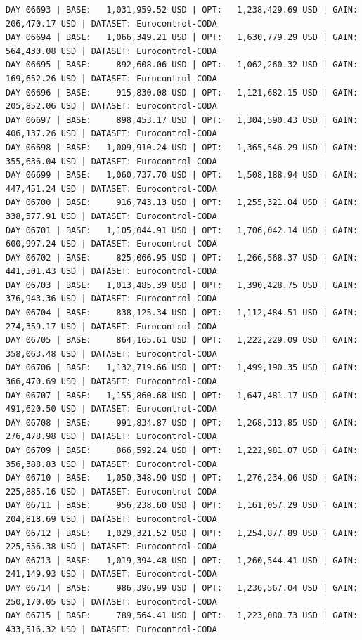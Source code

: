 \documentclass[11pt,a4paper]{article}
\begin{document}
\begin{verbatim}
DAY 06693 | BASE:   1,031,959.52 USD | OPT:   1,238,429.69 USD | GAIN: 206,470.17 USD | DATASET: Eurocontrol-CODA
DAY 06694 | BASE:   1,066,349.21 USD | OPT:   1,630,779.29 USD | GAIN: 564,430.08 USD | DATASET: Eurocontrol-CODA
DAY 06695 | BASE:     892,608.06 USD | OPT:   1,062,260.32 USD | GAIN: 169,652.26 USD | DATASET: Eurocontrol-CODA
DAY 06696 | BASE:     915,830.08 USD | OPT:   1,121,682.15 USD | GAIN: 205,852.06 USD | DATASET: Eurocontrol-CODA
DAY 06697 | BASE:     898,453.17 USD | OPT:   1,304,590.43 USD | GAIN: 406,137.26 USD | DATASET: Eurocontrol-CODA
DAY 06698 | BASE:   1,009,910.24 USD | OPT:   1,365,546.29 USD | GAIN: 355,636.04 USD | DATASET: Eurocontrol-CODA
DAY 06699 | BASE:   1,060,737.70 USD | OPT:   1,508,188.94 USD | GAIN: 447,451.24 USD | DATASET: Eurocontrol-CODA
DAY 06700 | BASE:     916,743.13 USD | OPT:   1,255,321.04 USD | GAIN: 338,577.91 USD | DATASET: Eurocontrol-CODA
DAY 06701 | BASE:   1,105,044.91 USD | OPT:   1,706,042.14 USD | GAIN: 600,997.24 USD | DATASET: Eurocontrol-CODA
DAY 06702 | BASE:     825,066.95 USD | OPT:   1,266,568.37 USD | GAIN: 441,501.43 USD | DATASET: Eurocontrol-CODA
DAY 06703 | BASE:   1,013,485.39 USD | OPT:   1,390,428.75 USD | GAIN: 376,943.36 USD | DATASET: Eurocontrol-CODA
DAY 06704 | BASE:     838,125.34 USD | OPT:   1,112,484.51 USD | GAIN: 274,359.17 USD | DATASET: Eurocontrol-CODA
DAY 06705 | BASE:     864,165.61 USD | OPT:   1,222,229.09 USD | GAIN: 358,063.48 USD | DATASET: Eurocontrol-CODA
DAY 06706 | BASE:   1,132,719.66 USD | OPT:   1,499,190.35 USD | GAIN: 366,470.69 USD | DATASET: Eurocontrol-CODA
DAY 06707 | BASE:   1,155,860.68 USD | OPT:   1,647,481.17 USD | GAIN: 491,620.50 USD | DATASET: Eurocontrol-CODA
DAY 06708 | BASE:     991,834.87 USD | OPT:   1,268,313.85 USD | GAIN: 276,478.98 USD | DATASET: Eurocontrol-CODA
DAY 06709 | BASE:     866,592.24 USD | OPT:   1,222,981.07 USD | GAIN: 356,388.83 USD | DATASET: Eurocontrol-CODA
DAY 06710 | BASE:   1,050,348.90 USD | OPT:   1,276,234.06 USD | GAIN: 225,885.16 USD | DATASET: Eurocontrol-CODA
DAY 06711 | BASE:     956,238.60 USD | OPT:   1,161,057.29 USD | GAIN: 204,818.69 USD | DATASET: Eurocontrol-CODA
DAY 06712 | BASE:   1,029,321.52 USD | OPT:   1,254,877.89 USD | GAIN: 225,556.38 USD | DATASET: Eurocontrol-CODA
DAY 06713 | BASE:   1,019,394.48 USD | OPT:   1,260,544.41 USD | GAIN: 241,149.93 USD | DATASET: Eurocontrol-CODA
DAY 06714 | BASE:     986,396.99 USD | OPT:   1,236,567.04 USD | GAIN: 250,170.05 USD | DATASET: Eurocontrol-CODA
DAY 06715 | BASE:     789,564.41 USD | OPT:   1,223,080.73 USD | GAIN: 433,516.32 USD | DATASET: Eurocontrol-CODA

\end{verbatim}
\end{document}
